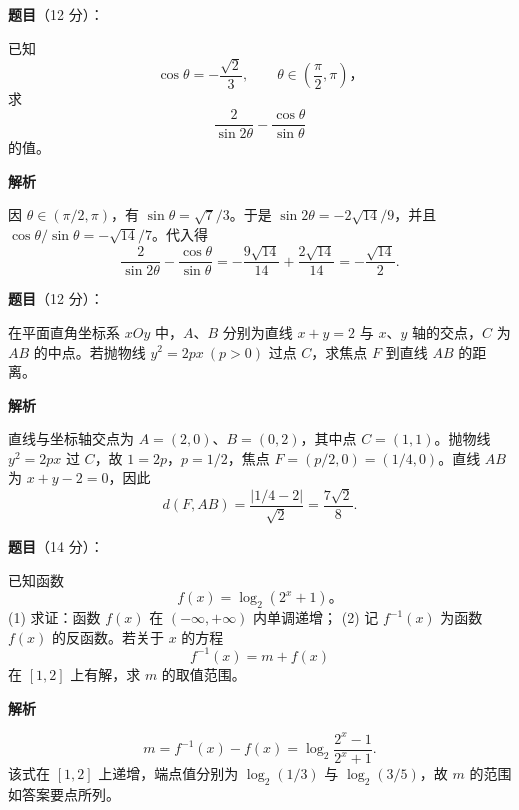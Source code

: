 \begin{answer}

\textbf{题目}（12 分）：

已知
\nopagebreak[4]
\[
\cos\theta=-\frac{\sqrt2}{3},\qquad \theta\in\left(\frac\pi2,\pi\right)\text{，}
\]
求
\nopagebreak[4]
\[
\frac2{\sin 2\theta}-\frac{\cos\theta}{\sin\theta}
\]
的值。

\textbf{解析}

因 $\theta\in(\pi/2,\pi)$，有 $\sin\theta=\sqrt7/3$。于是 $\sin2\theta=-2\sqrt{14}/9$，并且 $\cos\theta/\sin\theta=-\sqrt{14}/7$。代入得
\nopagebreak[4]
\[
\frac2{\sin2\theta}-\frac{\cos\theta}{\sin\theta}
=-\frac{9\sqrt{14}}{14}+\frac{2\sqrt{14}}{14}
=-\frac{\sqrt{14}}2.
\]


\end{answer}
\begin{answer}

\textbf{题目}（12 分）：

在平面直角坐标系 \(xOy\) 中，\(A\text{、}B\) 分别为直线 \(x+y=2\) 与 \(x\text{、}y\) 轴的交点，\(C\) 为 \(AB\) 的中点。若抛物线 \(y^2=2px\ (p>0)\) 过点 \(C\)，求焦点 \(F\) 到直线 \(AB\) 的距离。

\textbf{解析}

直线与坐标轴交点为 $A=(2,0)$、$B=(0,2)$，其中点 $C=(1,1)$。抛物线 $y^2=2px$ 过 $C$，故 $1=2p$，$p=1/2$，焦点 $F=(p/2,0)=(1/4,0)$。直线 $AB$ 为 $x+y-2=0$，因此
\nopagebreak[4]
\[
d(F,AB)=\frac{|1/4-2|}{\sqrt2}=\frac{7\sqrt2}{8}.
\]


\end{answer}
\begin{answer}

\textbf{题目}（14 分）：

已知函数
\nopagebreak[4]
\[
f(x)=\log_2(2^x+1)\text{。}
\]
(1) 求证：函数 \(f(x)\) 在 \((-\infty,+\infty)\) 内单调递增；
(2) 记 \(f^{-1}(x)\) 为函数 \(f(x)\) 的反函数。若关于 \(x\) 的方程
\nopagebreak[4]
\[
   f^{-1}(x)=m+f(x)
\]
   在 \([1,2]\) 上有解，求 \(m\) 的取值范围。

\textbf{解析}

\nopagebreak[4]
\[
m=f^{-1}(x)-f(x)=\log_2\frac{2^x-1}{2^x+1}.
\]
   该式在 $[1,2]$ 上递增，端点值分别为 $\log_2(1/3)$ 与 $\log_2(3/5)$，故 $m$ 的范围如答案要点所列。



\end{answer}
